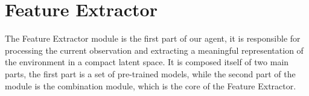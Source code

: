 



\section{Feature Extractor} \label{sec:feature_extractor}
The Feature Extractor module is the first part of our agent, it is responsible for processing the current observation and extracting a meaningful representation of the environment in a compact latent space.
It is composed itself of two main parts, the first part is a set of pre-trained models, while the second part of the module is the combination module, which is the core of the Feature Extractor.


